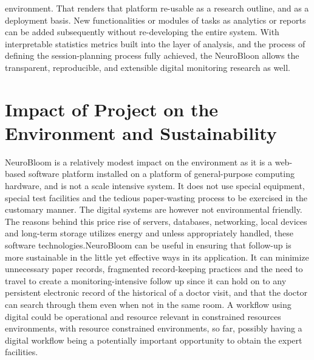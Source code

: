 \documentclass[12pt,a4paper]{report}
\begin{document}
environment. That renders that platform re-usable as a research outline, and as a deployment basis. New functionalities or modules of tasks as analytics or reports can be added subsequently without re-developing the entire system. With interpretable statistics metrics built into the layer of analysis, and the process of defining the session-planning process fully achieved, the NeuroBloon allows the transparent, reproducible, and extensible digital monitoring research as well.


\section{Impact of Project on the Environment and Sustainability}
NeuroBloom is a relatively modest impact on the environment as it is a web-based software platform installed on a platform of general-purpose computing hardware, and is not a scale intensive system. It does not use special equipment, special test facilities and the tedious paper-wasting process to be exercised in the customary manner. The digital systems are however not environmental friendly. The reasons behind this price rise of servers, databases, networking, local devices and long-term storage utilizes energy and unless appropriately handled, these software technologies.NeuroBloom can be useful in ensuring that follow-up is more sustainable in the little yet effective ways in its application. It can minimize unnecessary paper records, fragmented record-keeping practices and the need to travel to create a monitoring-intensive follow up since it can hold on to any persistent electronic record of the historical of a doctor visit, and that the doctor can search through them even when not in the same room. A workflow using digital could be operational and resource relevant in constrained resources environments, with resource constrained environments, so far, possibly having a digital workflow being a potentially important opportunity to obtain the expert facilities.
\end{document}
